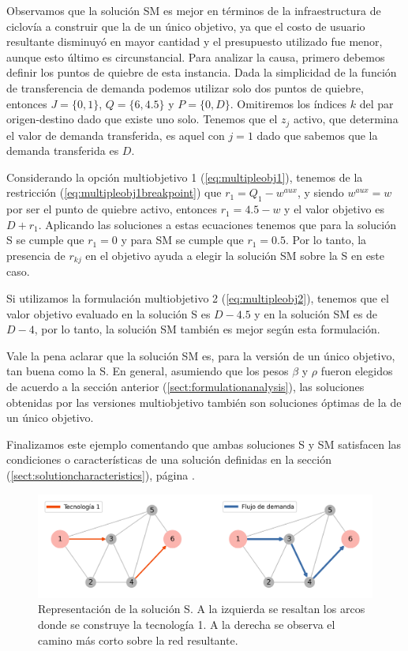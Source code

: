 Observamos que la solución SM es mejor en términos de la infraestructura de ciclovía a construir que la de un único objetivo, ya que el costo de usuario resultante disminuyó en mayor cantidad y el presupuesto utilizado fue menor, aunque esto último es circunstancial. Para analizar la causa, primero debemos definir los puntos de quiebre de esta instancia. Dada la simplicidad de la función de transferencia de demanda podemos utilizar solo dos puntos de quiebre, entonces $J = \{0, 1\}$, $Q = \{6, 4.5\}$ y $P = \{0, D\}$. Omitiremos los índices $k$ del par origen-destino dado que existe uno solo. Tenemos que el $z_j$ activo, que determina el valor de demanda transferida, es aquel con $j = 1$ dado que sabemos que la demanda transferida es $D$.

Considerando la opción multiobjetivo 1 (\ref{eq:multipleobj1}), tenemos de la restricción (\ref{eq:multipleobj1breakpoint}) que $r_1 = Q_1 - w^{aux}$, y siendo $w^{aux} = w$ por ser el punto de quiebre activo, entonces $r_1 = 4.5 - w$ y el valor objetivo es $D + r_1$. Aplicando las soluciones a estas ecuaciones tenemos que para la solución S se cumple que $r_1 = 0$ y para SM se cumple que $r_1 = 0.5$. Por lo tanto, la presencia de $r_{kj}$ en el objetivo ayuda a elegir la solución SM sobre la S en este caso.

Si utilizamos la formulación multiobjetivo 2 (\ref{eq:multipleobj2}), tenemos que el valor objetivo evaluado en la solución S es $D - 4.5$ y en la solución SM es de $D - 4$, por lo tanto, la solución SM también es mejor según esta formulación.

Vale la pena aclarar que la solución SM es, para la versión de un único objetivo, tan buena como la S. En general, asumiendo que los pesos $\beta$ y $\rho$ fueron elegidos de acuerdo a la sección anterior (\ref{sect:formulationanalysis}), las soluciones obtenidas por las versiones multiobjetivo también son soluciones óptimas de la de un único objetivo.

Finalizamos este ejemplo comentando que ambas soluciones S y SM satisfacen las condiciones o características de una solución definidas en la sección (\ref{sect:solutioncharacteristics}), página \pageref{sect:solutioncharacteristics}.

\begin{figure}[h!]
  \centering
  \includegraphics[width=\linewidth]{../resources/example_2_sol_v2.png}
  \caption{Representación de la solución S. A la izquierda se resaltan los arcos donde se construye la tecnología 1. A la derecha se observa el camino más corto sobre la red resultante.}
  \label{fig:example2solv2}
\end{figure}


